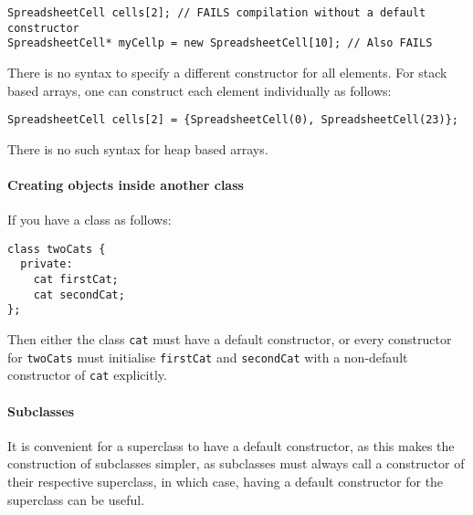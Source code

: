 \documentclass[a4paper,12pt]{article}
\begin{document}
\begin{lstlisting}
SpreadsheetCell cells[2]; // FAILS compilation without a default constructor
SpreadsheetCell* myCellp = new SpreadsheetCell[10]; // Also FAILS
\end{lstlisting}

There is no syntax to specify a different constructor for all elements. For stack based arrays, one can construct each element individually as follows:

\begin{lstlisting}[caption={Example of \emph{initialisers}}]
SpreadsheetCell cells[2] = {SpreadsheetCell(0), SpreadsheetCell(23)};
\end{lstlisting}

There is no such syntax for heap based arrays.

\paragraph{Creating objects inside another class}
If you have a class as follows:

\begin{lstlisting}
class twoCats {
  private:
    cat firstCat;
    cat secondCat;
};
\end{lstlisting}
Then either the class \lstinline|cat| must have a default constructor, or every constructor for \lstinline|twoCats| must initialise \lstinline|firstCat| and \lstinline|secondCat| with a non-default constructor of \lstinline|cat| explicitly.

\paragraph{Subclasses}
It is convenient for a superclass to have a default constructor, as this makes the construction of subclasses simpler, as subclasses must always call a constructor of their respective superclass, in which case, having a default constructor for the superclass can be useful.
\end{document}
